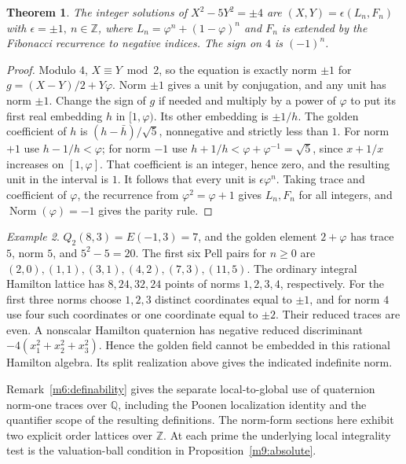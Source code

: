\documentclass[11pt,reqno]{amsart}
\newtheorem{theorem}{Theorem}[section]
\theoremstyle{definition}
\theoremstyle{remark}
\newtheorem{example}[theorem]{Example}
\numberwithin{equation}{section}
\newcommand{\Q}{\mathbb{Q}}
\newcommand{\Z}{\mathbb{Z}}
\begin{document}
\begin{theorem}\label{m9:pell}
The integer solutions of \(X^2-5Y^2=\pm4\) are
\((X,Y)=\epsilon(L_n,F_n)\) with \(\epsilon=\pm1,\ n\in\Z\),
where \(L_n=\varphi^n+(1-\varphi)^n\) and \(F_n\) is extended
by the Fibonacci recurrence to negative indices. The sign
on \(4\) is \((-1)^n\).
\end{theorem}
\begin{proof}
Modulo \(4\), \(X\equiv Y\bmod2\), so the equation is exactly
norm \(\pm1\) for \(g=(X-Y)/2+Y\varphi\).
Norm \(\pm1\) gives a unit by conjugation, and any unit has
norm \(\pm1\). Change the sign of \(g\) if needed and multiply
by a power of \(\varphi\) to put its first real embedding
\(h\) in \([1,\varphi)\). Its other embedding is \(\pm1/h\).
The golden coefficient of \(h\) is
\((h-\bar h)/\sqrt5\), nonnegative and strictly less than \(1\).
For norm \(+1\) use \(h-1/h<\varphi\); for norm \(-1\) use
\(h+1/h<\varphi+\varphi^{-1}=\sqrt5\), since \(x+1/x\) increases
on \([1,\varphi]\). That coefficient is an integer, hence
zero, and the resulting unit in the interval is \(1\).
It follows that every unit is \(\epsilon\varphi^n\).
Taking trace and coefficient of \(\varphi\), the recurrence
from \(\varphi^2=\varphi+1\) gives \(L_n,F_n\) for all integers,
and \(\operatorname{Norm}(\varphi)=-1\) gives the parity rule.
\end{proof}

\begin{example}\label{m9:lattice-examples}
\(Q_2(8,3)=E(-1,3)=7\), and the golden element
\(2+\varphi\) has trace \(5\), norm \(5\), and \(5^2-5=20\).
The first six Pell pairs for \(n\ge0\) are
\((2,0),(1,1),(3,1),(4,2),(7,3),(11,5)\).
The ordinary integral Hamilton lattice has \(8,24,32,24\)
points of norms \(1,2,3,4\), respectively. For the first three
norms choose \(1,2,3\) distinct coordinates equal to \(\pm1\),
and for norm \(4\) use four such coordinates or one coordinate
equal to \(\pm2\). Their reduced traces are even.
A nonscalar Hamilton quaternion has negative reduced
discriminant \(-4(x_1^2+x_2^2+x_3^2)\). Hence the golden
field cannot be embedded in this rational Hamilton algebra.
Its split realization above gives the indicated indefinite norm.
\end{example}

Remark~\ref{m6:definability} gives the separate local-to-global
use of quaternion norm-one traces over \(\Q\), including the
Poonen localization identity and the quantifier scope of the
resulting definitions. The norm-form sections here exhibit two
explicit order lattices over \(\Z\). At each prime the underlying
local integrality test is the valuation-ball condition in
Proposition~\ref{m9:absolute}.
\end{document}
